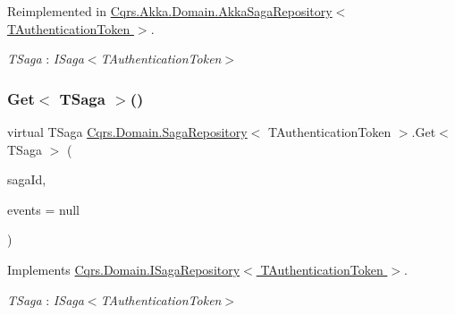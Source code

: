 Reimplemented in \hyperlink{classCqrs_1_1Akka_1_1Domain_1_1AkkaSagaRepository_a2c7263d0e58d2b31149ec685d5be934a}{Cqrs.\+Akka.\+Domain.\+Akka\+Saga\+Repository$<$ T\+Authentication\+Token $>$}.

\begin{Desc}
\item[Type Constraints]\begin{description}
\item[{\em T\+Saga} : {\em I\+Saga$<$T\+Authentication\+Token$>$}]\end{description}
\end{Desc}
\mbox{\label{classCqrs_1_1Domain_1_1SagaRepository_a1b80ecc2a5719d1681ca5d182a252120}} 
\subsubsection{\texorpdfstring{Get$<$ T\+Saga $>$()}{Get< TSaga >()}}
{\footnotesize\ttfamily virtual T\+Saga \hyperlink{classCqrs_1_1Domain_1_1SagaRepository}{Cqrs.\+Domain.\+Saga\+Repository}$<$ T\+Authentication\+Token $>$.Get$<$ T\+Saga $>$ (\begin{DoxyParamCaption}\item[{Guid}]{saga\+Id,  }\item[{I\+List$<$ \hyperlink{interfaceCqrs_1_1Events_1_1ISagaEvent}{I\+Saga\+Event}$<$ T\+Authentication\+Token $>$$>$}]{events = {\ttfamily null} }\end{DoxyParamCaption})\hspace{0.3cm}{\ttfamily [virtual]}}



Implements \hyperlink{interfaceCqrs_1_1Domain_1_1ISagaRepository_aa3409bf59bbe489afcc89716928e9ad1}{Cqrs.\+Domain.\+I\+Saga\+Repository$<$ T\+Authentication\+Token $>$}.

\begin{Desc}
\item[Type Constraints]\begin{description}
\item[{\em T\+Saga} : {\em I\+Saga$<$T\+Authentication\+Token$>$}]\end{description}
\end{Desc}
\mbox{\label{classCqrs_1_1Domain_1_1SagaRepository_acc59a4478bb992b03690f0cda3e4e362}} 
